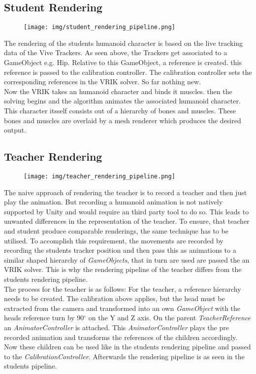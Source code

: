 \subsection{Student Rendering}
\begin{figure}
	\centering
	\texttt{[image: img/student\_rendering\_pipeline.png]}
	\caption{}
	\label{fig:student_rendering_pipeline}
\end{figure}
The rendering of the students humanoid character is based on the live tracking data of the Vive Trackers. As seen above, the Trackers get associated to a GameObject e.g. Hip. Relative to this GameObject, a reference is created. this reference is passed to the calibration controller. The calibration controller sets the corresponding references in the VRIK solver. So far nothing new.\\
Now the VRIK takes an humanoid character and binds it muscles. then the solving begins and the algorithm animates the associated humanoid character. This character itsself consists out of a hierarchy of bones and muscles. These bones and muscles are overlaid by a mesh renderer which produces the desired output.%
\subsection{Teacher Rendering}
\begin{figure}
	\centering
	\texttt{[image: img/teacher\_rendering\_pipeline.png]}
	\caption{}
	\label{fig:teacher_rendering_pipeline}
\end{figure}
The naive approach of rendering the teacher is to record a teacher and then just play the animation. But recording a humanoid animation is not natively supported by Unity and would require an third party tool to do so. This leads to unwanted differences in the representation of the teacher. To ensure, that teacher and student produce comparable renderings, the same technique has to be utilised. To accomplish this requirement, the movements are recorded by recording the students tracker position and then pass this as animations to a similar shaped hierarchy of \textit{GameObjects}, that in turn are used are passed the an VRIK solver. This is why the rendering pipeline of the teacher differs from the students rendering pipeline.\\
The process for the teacher is as follows:
For the teacher, a reference hierarchy needs to be created. The calibration above applies, but the head must be extracted from the camera and transformed into an own \textit{GameObject} with the heads reference turn by 90$^\circ$ on the Y and Z axis. On the parent \textit{TeacherReference} an \textit{AnimatorController} is attached. This \textit{AnimatorController} plays the pre recorded animation and transforms the references of the children accordingly. Now these children can be used like in the students rendering pipeline and passed to the \textit{CalibrationController}. Afterwards the rendering pipeline is as seen in the students pipeline.%
